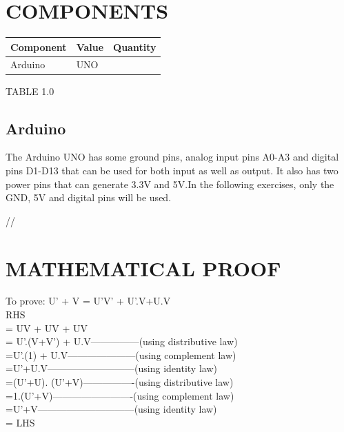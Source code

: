 \documentclass[10pt, a4paper]{article}
\title{\mytitle}
\author{\myauthor\hspace{1em}\\\contact\\IITH\hspace{0.5em}-\hspace{0.5em}\mymodule}
\date{}
\begin{document}
   
	\maketitle
	\tableofcontents
	\begin{abstract}
	   The objective of this manual is to show how
       to Verify the Boolean Expression 
	        U’ + V = U’V’ + U’.V+U.V
	\end{abstract}

\section{COMPONENTS}
\begin{tabularx}{0.45\textwidth} { 
  | >{\centering\arraybackslash}X 
  | >{\centering\arraybackslash}X
  | >{\centering\arraybackslash}X | }
\hline
\textbf{Component} & \textbf{Value} & \textbf{Quantity} \\      
\hline
Arduino & UNO & 1 \\
\hline
\end{tabularx}
\begin{center}
    TABLE 1.0
\end{center}
	
	\subsection{Arduino}
	\hspace{10cm}
	
	The Arduino UNO has some ground pins, analog input pins A0-A3 and digital pins D1-D13 that can be used for both input as well as output. It also has two power pins that can generate 3.3V and 5V.In the following exercises, only the GND, 5V and digital pins will be used.
	
//


\section{MATHEMATICAL PROOF}
To prove: U’ + V = U’V’ + U’.V+U.V
\\RHS 
\\= UV + UV + UV
\\= U’.(V+V’) + U.V---------------(using distributive law)
\\=U’.(1) + U.V---------------------(using complement law)
\\=U’+U.V---------------------------(using identity law)
\\=(U’+U). (U’+V)----------------(using distributive law)
\\=1.(U’+V)-------------------------(using complement law)
\\=U’+V------------------------------(using identity law)
\\= LHS
\end{document}
